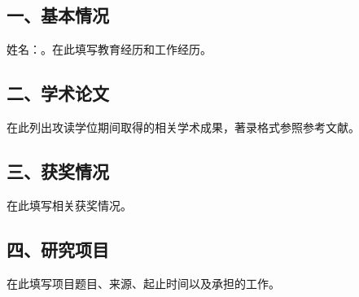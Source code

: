 \subsection*{一、基本情况}
姓名：。在此填写教育经历和工作经历。

\subsection*{二、学术论文}
在此列出攻读学位期间取得的相关学术成果，著录格式参照参考文献。

\subsection*{三、获奖情况}
在此填写相关获奖情况。

\subsection*{四、研究项目}
在此填写项目题目、来源、起止时间以及承担的工作。
